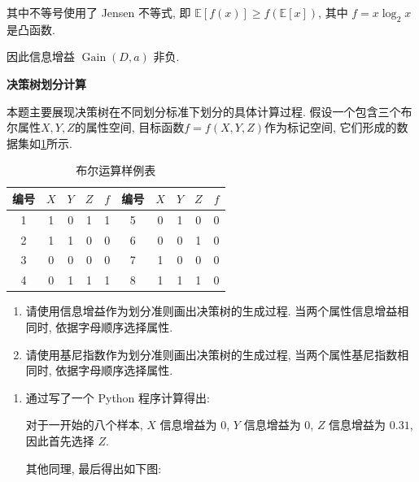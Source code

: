 \documentclass[answers]{exam}  %
\begin{document}
\begin{questions}
\begin{solution}
\begin{enumerate}
            其中不等号使用了 Jensen 不等式, 即 $\mathbb{E}[f(x)] \ge f(\mathbb{E}[x])$, 其中 $f=x\log_2 x$ 是凸函数.

            因此信息增益 $\operatorname{Gain}(D, a)$ 非负.
    \end{enumerate}
  \end{solution}


  \question [15] \textbf{决策树划分计算} \label{ch4_prob:get_tree}

  本题主要展现决策树在不同划分标准下划分的具体计算过程. 假设一个包含三个布尔属性$X, Y, Z$的属性空间, 目标函数$f=f(X, Y, Z)$作为标记空间, 它们形成的数据集如\ref{ch4_tab:bool_table}所示.
  \begin{table}[ht]
    \centering
    \caption{布尔运算样例表}\label{ch4_tab:bool_table}
    \tabcolsep 15pt
    \begin{tabular}{cccc|c||cccc|c}
      \hline
      编号     & $X$ & $Y$ & $Z$ & $f$ & 编号 & $X$ & $Y$ & $Z$ & $f$ \\
      \hline 1 & 1   & 0   & 1   & 1   & 5    & 0   & 1   & 0   & 0   \\
      2        & 1   & 1   & 0   & 0   & 6    & 0   & 0   & 1   & 0   \\
      3        & 0   & 0   & 0   & 0   & 7    & 1   & 0   & 0   & 0   \\
      4        & 0   & 1   & 1   & 1   & 8    & 1   & 1   & 1   & 0   \\
      \hline
    \end{tabular}
  \end{table}
  \begin{enumerate}
    \item 请使用信息增益作为划分准则画出决策树的生成过程. 当两个属性信息增益相同时, 依据字母顺序选择属性.
    \item 请使用基尼指数作为划分准则画出决策树的生成过程, 当两个属性基尼指数相同时, 依据字母顺序选择属性.
  \end{enumerate}

  \begin{solution}
    \begin{enumerate}
      \item

            通过写了一个 Python 程序计算得出:

            对于一开始的八个样本, $X$ 信息增益为 $0$, $Y$ 信息增益为 $0$, $Z$ 信息增益为 $0.31$, 因此首先选择 $Z$.

            其他同理, 最后得出如下图:


\end{enumerate}
\end{solution}
\end{questions}
\end{document}
